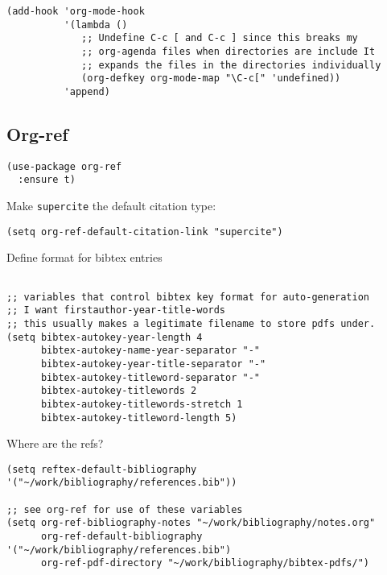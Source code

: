 \documentclass[12pt]{article}
\begin{document}
\begin{verbatim}
(add-hook 'org-mode-hook
          '(lambda ()
             ;; Undefine C-c [ and C-c ] since this breaks my
             ;; org-agenda files when directories are include It
             ;; expands the files in the directories individually
             (org-defkey org-mode-map "\C-c[" 'undefined))
          'append)

\end{verbatim}

\subsection{Org-ref}
\label{sec:orgaa338a4}

\begin{verbatim}
(use-package org-ref
  :ensure t)
\end{verbatim}

Make \texttt{supercite} the default citation type:
\begin{verbatim}
(setq org-ref-default-citation-link "supercite")
\end{verbatim}


Define format for bibtex entries


\begin{verbatim}

;; variables that control bibtex key format for auto-generation
;; I want firstauthor-year-title-words
;; this usually makes a legitimate filename to store pdfs under.
(setq bibtex-autokey-year-length 4
      bibtex-autokey-name-year-separator "-"
      bibtex-autokey-year-title-separator "-"
      bibtex-autokey-titleword-separator "-"
      bibtex-autokey-titlewords 2
      bibtex-autokey-titlewords-stretch 1
      bibtex-autokey-titleword-length 5)
\end{verbatim}

Where are the refs?

\begin{verbatim}
(setq reftex-default-bibliography '("~/work/bibliography/references.bib"))

;; see org-ref for use of these variables
(setq org-ref-bibliography-notes "~/work/bibliography/notes.org"
      org-ref-default-bibliography '("~/work/bibliography/references.bib")
      org-ref-pdf-directory "~/work/bibliography/bibtex-pdfs/")



\end{verbatim}
\end{document}
